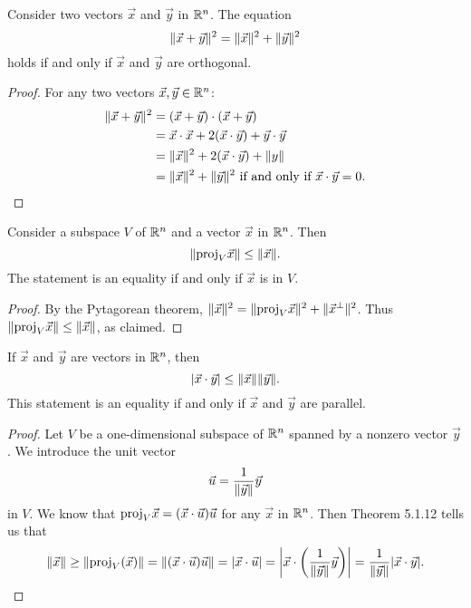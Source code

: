 \documentclass[a4paper,11pt]{article}
\begin{document}
\begin{outline}
    Consider two vectors \(\vec{x}\) and \(\vec{y}\) in \(\mathbb{R}^n\). The equation \[\|\vec{x}+\vec{y}\|^2 = 
    \|\vec{x}\|^2 + \|\vec{y}\|^2 \] holds if and only if \(\vec{x}\) and \(\vec{y}\) are orthogonal.
    
    \begin{proof}
      For any two vectors \(\vec{x}, \vec{y} \in \mathbb{R}^n\):
      \begin{align*}
        \|\vec{x}+\vec{y}\|^2 &= (\vec{x}+\vec{y})\cdot(\vec{x}+\vec{y}) \\
                                 &= \vec{x}\cdot\vec{x} + 2(\vec{x}\cdot\vec{y}) + \vec{y}\cdot\vec{y} \\
                                 &= \|\vec{x}\|^2+2(\vec{x}\cdot\vec{y})+\|y\| \\
                                 &= \|\vec{x}\|^2+\|\vec{y}\|^2\text{ if and only if }\vec{x}\cdot\vec{y} = 0\text{.}
      \end{align*}
    \end{proof}
    
    Consider a subspace \(V\) of \(\mathbb{R}^n\) and a vector \(\vec{x}\) in \(\mathbb{R}^n\). Then 
    \[\|\text{proj}_V\vec{x}\| \leq \|\vec{x}\|\text{.}\] The statement is an equality if and only 
    if \(\vec{x}\) is in \(V\).
    
    \begin{proof}
      By the Pytagorean theorem, \(\|\vec{x}\|^2 = \|\text{proj}_V\vec{x}\|^2 + \|\vec{x}^{\perp}\|^2\).
      Thus \(\|\text{proj}_V\vec{x}\| \leq \|\vec{x}\|\), as claimed.
    \end{proof}
    
    If \(\vec{x}\) and \(\vec{y}\) are vectors in \(\mathbb{R}^n\), then \[|\vec{x}\cdot\vec{y}| \leq 
    \|\vec{x}\|\|\vec{y}\|\text{.}\] This statement is an equality if and only if \(\vec{x}\) 
    and \(\vec{y}\) are parallel.
    
    \begin{proof}
      Let \(V\) be a one-dimensional subspace of \(\mathbb{R}^n\) spanned by a nonzero vector \(\vec{y}\). 
      We introduce the unit vector \[\vec{u} = \frac{1}{\|\vec{y}\|}\vec{y}\] in \(V\). We know that 
      \(\text{proj}_V\vec{x} = (\vec{x}\cdot\vec{u})\vec{u}\) for any \(\vec{x}\) in \(\mathbb{R}^n\). Then Theorem 5.1.12 
      tells us that 
      \[ \|\vec{x}\|\geq\|\text{proj}_V(\vec{x})\| 
         = \|(\vec{x}\cdot\vec{u})\vec{u}\| 
         = |\vec{x}\cdot\vec{u}|=\left|\vec{x}\cdot\left(\frac{1}{\|\vec{y}\|}\vec{y}\right)\right| 
         = \frac{1}{\|\vec{y}\|}|\vec{x}\cdot\vec{y}|\text{.}
      \]
    \end{proof}
    

\end{outline}
\end{document}
